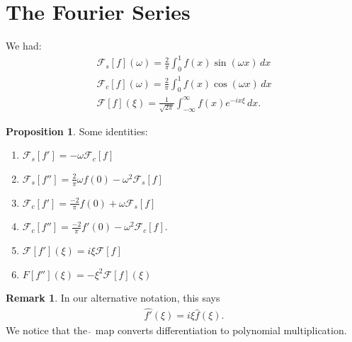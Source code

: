 \documentclass{book}
\theoremstyle{definition}
\newtheorem{prop}{Proposition}[section]
\newtheorem{rmk}{Remark}[section]
\newcommand{\F}{\mathcal{F}}
\begin{document}

\section{The Fourier Series}
We had:
\begin{align*}
\F_s[f](\omega) = \frac{2}{\pi}\int^1_0 f(x)\sin(\omega x)\,dx\\
\F_c[f](\omega) = \frac{2}{\pi}\int^1_0 f(x)\cos(\omega x)\,dx\\
\F[f](\xi) = \frac{1}{\sqrt{2\pi}}\int^\infty_{-\infty}f(x)e^{-ix\xi}\,dx.
\end{align*}

\begin{prop} Some identities:
	\begin{enumerate}
		\item $\F_s[f'] = -\omega \F_c[f]$\\
		\item $\F_s[f''] = \frac{2}{\pi}\omega f(0) - \omega^2 \F_s[f]$\\
		\item $\F_c[f'] = \frac{-2}{\pi}f(0) + \omega\F_s[f]$\\
		\item $\F_c[f''] = \frac{-2}{\pi}f'(0) - \omega^2 \F_c[f]$.\\
		\item $\F[f'](\xi) = i\xi \F[f] $\\
		\item $F[f''](\xi) = -\xi^2\F[f](\xi)$
	\end{enumerate}
\end{prop}


\begin{rmk}
	In our alternative notation, this says
	\begin{align*}
	\hat{f'}(\xi) = i\xi \hat{f}(\xi).
	\end{align*}
	We notice that the $\hat{\,}$ map converts differentiation to polynomial multiplication.\\
\end{rmk}
\end{document}
